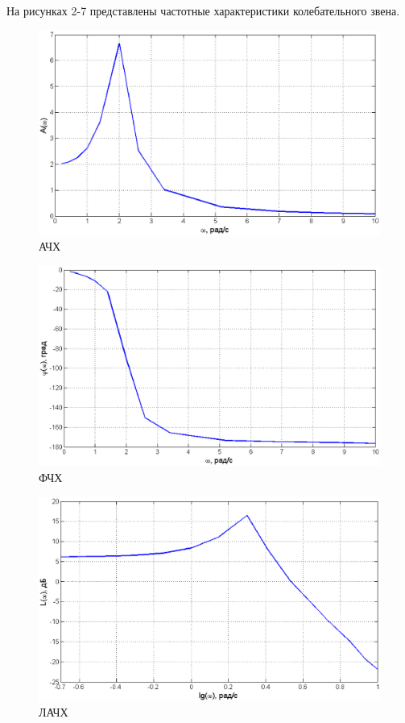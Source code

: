 \documentclass[12pt,a4paper]{article}
\begin{document}
На рисунках 2-7 представлены частотные характеристики колебательного звена.
\begin{figure}[H]
	\centering
	\includegraphics[width=1\linewidth]{ACHH1.eps}
	\caption{АЧХ}
\end{figure}
\begin{figure}[H]
	\centering
	\includegraphics[width=1\linewidth]{FCHH1.eps}
	\caption{ФЧХ}
\end{figure}
\begin{figure}[H]
	\centering
	\includegraphics[width=1\linewidth]{LACHH1.eps}
	\caption{ЛАЧХ}
\end{figure}
\end{document}
